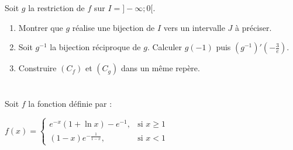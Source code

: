 Soit \( g \) la restriction de \( f \) sur \( I = ]-\infty; 0[ \).

\begin{enumerate}
    \item Montrer que \( g \) réalise une bijection de \( I \) vers un intervalle \( J \) à préciser.
    \item Soit \( g^{-1} \) la bijection réciproque de \( g \). Calculer \( g(-1) \) puis \( (g^{-1})'\left(-\frac{3}{e}\right) \).
    \item Construire \( (C_f) \) et \( (C_g) \) dans un même repère.
\end{enumerate}


\section*{}

Soit \( f \) la fonction définie par :

\( f(x) =
\begin{cases}
    e^{-x} (1 + \ln x) - e^{-1},  & \text{si } x \geq 1 \\
    (1 - x) e^{-\frac{1}{1 - x}}, & \text{si } x < 1
\end{cases} \)

